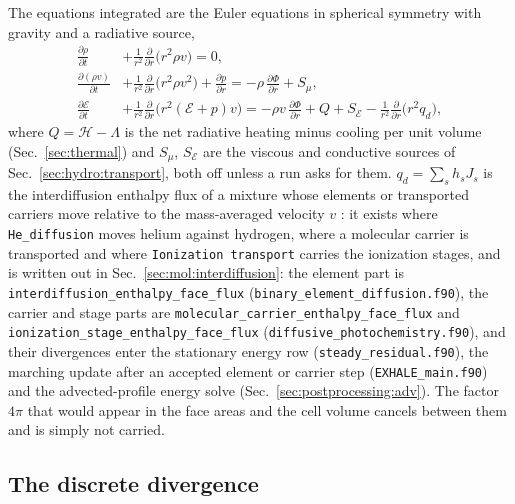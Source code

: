 The equations integrated are the Euler equations in spherical symmetry with
gravity and a radiative source,
%
\begin{equation}
  \begin{aligned}
    \frac{\partial\rho}{\partial t}
      &+ \frac{1}{r^2}\frac{\partial}{\partial r}\bigl(r^2\rho v\bigr) = 0,\\
    \frac{\partial(\rho v)}{\partial t}
      &+ \frac{1}{r^2}\frac{\partial}{\partial r}\bigl(r^2\rho v^2\bigr)
       + \frac{\partial p}{\partial r}
       = -\rho\,\frac{\partial\Phi}{\partial r} + S_\mu,\\
    \frac{\partial \mathcal{E}}{\partial t}
      &+ \frac{1}{r^2}\frac{\partial}{\partial r}\bigl(r^2 (\mathcal{E}+p)v\bigr)
       = -\rho v\,\frac{\partial\Phi}{\partial r} + Q + S_{\mathcal{E}}
         - \frac{1}{r^2}\frac{\partial}{\partial r}\bigl(r^2 q_d\bigr),
  \end{aligned}
  \label{eq:euler}
\end{equation}
%
where $Q = \mathcal{H} - \Lambda$ is the net radiative heating minus cooling
per unit volume (Sec.~\ref{sec:thermal}) and $S_\mu$, $S_{\mathcal{E}}$ are the viscous and conductive
sources of Sec.~\ref{sec:hydro:transport}, both off unless a run asks for
them.  $q_d = \sum_s h_sJ_s$ is the interdiffusion enthalpy flux of a mixture
whose elements or transported carriers move relative to the mass-averaged
velocity $v$ \citep[eqs.~11--13]{Cook2009}: it exists where
\texttt{He\_diffusion} moves helium against hydrogen, where a molecular
carrier is transported and where \texttt{Ionization transport} carries the
ionization stages, and is written out in
Sec.~\ref{sec:mol:interdiffusion}: the element part is
\texttt{interdiffusion\_enthalpy\_face\_flux}
(\texttt{binary\_element\_diffusion.f90}), the carrier and stage parts are
\texttt{molecular\_carrier\_enthalpy\_face\_flux} and
\texttt{ionization\_stage\_enthalpy\_face\_flux}
(\texttt{diffusive\_photochemistry.f90}), and their divergences enter the
stationary energy row (\texttt{steady\_residual.f90}), the marching update
after an accepted element or carrier step (\texttt{EXHALE\_main.f90}) and the
advected-profile energy solve (Sec.~\ref{sec:postprocessing:adv}).  The factor $4\pi$ that would appear in the face areas and the cell
volume cancels between them and is simply not carried.

\subsection{The discrete divergence}
\label{sec:hydro:divergence}

